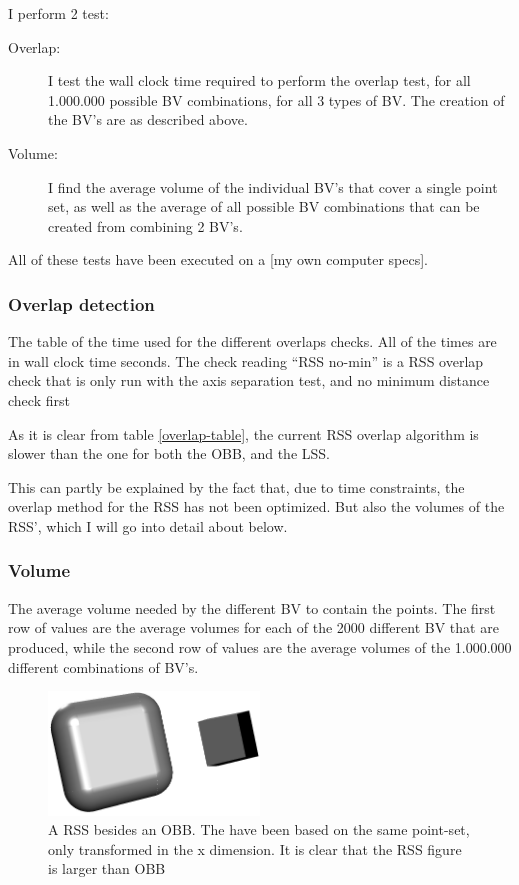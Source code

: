 I perform 2 test: 
\begin{description}
\item[Overlap:] I test the wall clock time required to perform the overlap test,
  for all 1.000.000 possible BV combinations, for all 3 types of BV. The creation of the BV's are as described above.  
\item[Volume:] I find the average volume of the individual BV's that cover a single point set, as well as the average of all possible BV combinations that can be created from combining 2 BV's.
\end{description}

All of these tests have been executed on a [my own computer specs].

\subsubsection{Overlap detection}

\begin{table}

\caption{\label{overlap-table}The table of the time used for the
  different overlaps checks. All of the times are in wall clock time seconds. The
  check reading ``RSS no-min'' is a RSS overlap check that is only run
with the axis separation test, and no minimum distance check first}
\end{table}

As it is clear from table \ref{overlap-table}, the current RSS overlap algorithm is slower than the one for both the OBB, and the LSS. 

This can partly be explained by the fact that, due to time constraints,
the overlap method for the RSS has not been optimized. But also the volumes of the RSS', which I will go into detail about below.

\subsubsection{Volume}
\label{volume-label}
\begin{table}

\caption{\label{volume-table} The average volume needed by the
  different BV to contain the points. The first row of values are the average
  volumes for each of the 2000 different BV that are produced, while
  the second row of values are the average volumes of the 1.000.000
  different combinations of BV's.}
\end{table}

\begin{figure}
\centering
\includegraphics[width=0.5\textwidth]{figures/compareRSSOBB}
\caption{\label{compare-example}A RSS besides an OBB. The have been based on the same point-set, only transformed in the x dimension. It is clear that the RSS figure is larger than OBB}
\end{figure}

